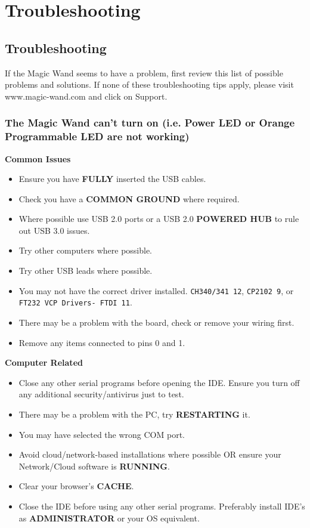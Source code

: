 %
%

\chapter{Troubleshooting}

\section{Troubleshooting}

If the Magic Wand seems to have a problem, first review this list of possible problems and solutions. If none of these troubleshooting tips apply, please visit www.magic-wand.com and click on Support.

\subsection{The Magic Wand can’t turn on (i.e. Power LED or Orange Programmable LED are not working)}

\textbf{Common Issues}
\begin{itemize}
	\item Ensure you have \textbf{FULLY} inserted the USB cables.
	\item Check you have a \textbf{COMMON GROUND} where required.
	\item Where possible use USB 2.0 ports or a USB 2.0 \textbf{POWERED HUB} to rule out USB 3.0 issues.
	\item Try other computers where possible.
	\item Try other USB leads where possible.
	\item You may not have the correct driver installed. \texttt{CH340/341 12}, \texttt{CP2102 9}, or \texttt{FT232 VCP Drivers- FTDI 11}.
	\item There may be a problem with the board, check or remove your wiring first.
	\item Remove any items connected to pins 0 and 1.
\end{itemize}

\textbf{Computer Related}
\begin{itemize}
	\item Close any other serial programs before opening the IDE. Ensure you turn off any additional security/antivirus just to test.
	\item There may be a problem with the PC, try \textbf{RESTARTING} it.
	\item You may have selected the wrong COM port.
	\item Avoid cloud/network-based installations where possible OR ensure your Network/Cloud software is \textbf{RUNNING}.
	\item Clear your browser's \textbf{CACHE}.
	\item Close the IDE before using any other serial programs. Preferably install IDE’s as \textbf{ADMINISTRATOR} or your OS equivalent.
\end{itemize}

